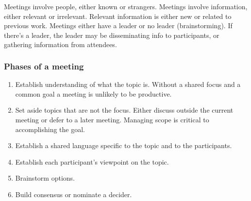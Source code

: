 Meetings involve people, either known or strangers.
Meetings involve information, either relevant or irrelevant. Relevant information is either new or related to previous work.
Meetings either have a leader or no leader (brainstorming). If there's a leader, the leader may be disseminating info to participants, or gathering information from attendees.


\subsubsection*{Phases of a meeting}

\begin{enumerate}
    \item Establish understanding of what the topic is. Without a shared focus and a common goal a meeting is unlikely to be productive. 
    \item Set aside topics that are not the focus. Either discuss outside the current meeting or defer to a later meeting. Managing scope is critical to accomplishing the goal. 
    \item Establish a shared language specific to the topic and to the participants.
    \item Establish each participant's viewpoint on the topic.
    \item Brainstorm options.
    \item Build consensus or nominate a decider.
\end{enumerate}